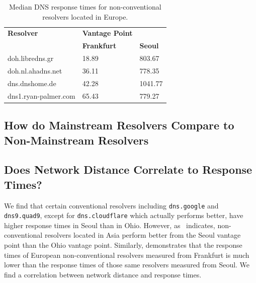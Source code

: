 \begin{table}
\centering
\begin{tabular}{lll}
\toprule
\textbf{Resolver} & \textbf{Vantage Point} & \\
                  & \textbf{Frankfurt}     & \textbf{Seoul} \\
\midrule
doh.libredns.gr      & 18.89                                                        & 803.67                                           \\
doh.nl.ahadns.net    & 36.11                                                        & 778.35                                           \\
dns.dnshome.de       & 42.28                                                        & 1041.77                                           \\ 
dns1.ryan-palmer.com & 65.43                                                        & 779.27                                           \\
\bottomrule
\end{tabular}
\caption{Median DNS response times for non-conventional resolvers located in Europe.}
\label{tab:UnconvEur}
\end{table}

\subsection{How do Mainstream Resolvers Compare to Non-Mainstream Resolvers}

\subsection{Does Network Distance Correlate to Response Times?}
We find that certain conventional resolvers including \texttt{dns.google} and \texttt{dns9.quad9}, except for \texttt{dns.cloudflare} which actually performs better, have higher response times in Seoul than in Ohio. 
However, as~ indicates, non-conventional resolvers located in Asia perform better from the Seoul vantage point than the Ohio vantage point. 
Similarly,  demonstrates that the response times of European non-conventional resolvers measured from Frankfurt is much lower than the response times of those same resolvers measured from Seoul. 
We find a correlation between network distance and response times. 
